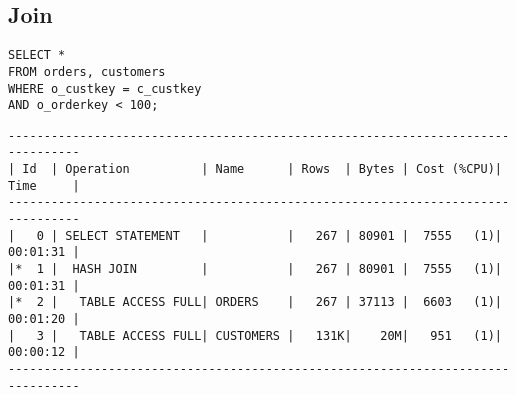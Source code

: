\documentclass[10pt]{article}
\begin{document}
\subsection{Join}
\begin{lstlisting}[style=sql]
SELECT *
FROM orders, customers
WHERE o_custkey = c_custkey
AND o_orderkey < 100;
\end{lstlisting}
\begin{lstlisting}[style=queryexecutionplan]
--------------------------------------------------------------------------------                                                                                                                                                                                                                             
| Id  | Operation          | Name      | Rows  | Bytes | Cost (%CPU)| Time     |                                                                                                                                                                                                                             
--------------------------------------------------------------------------------                                                                                                                                                                                                                             
|   0 | SELECT STATEMENT   |           |   267 | 80901 |  7555   (1)| 00:01:31 |                                                                                                                                                                                                                             
|*  1 |  HASH JOIN         |           |   267 | 80901 |  7555   (1)| 00:01:31 |                                                                                                                                                                                                                             
|*  2 |   TABLE ACCESS FULL| ORDERS    |   267 | 37113 |  6603   (1)| 00:01:20 |                                                                                                                                                                                                                             
|   3 |   TABLE ACCESS FULL| CUSTOMERS |   131K|    20M|   951   (1)| 00:00:12 |                                                                                                                                                                                                                             
-------------------------------------------------------------------------------- 
\end{lstlisting}  
\end{document}
